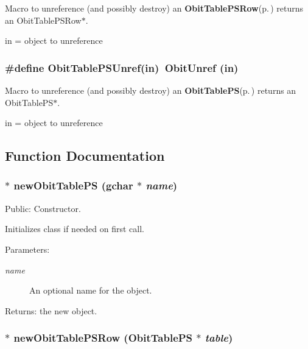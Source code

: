 Macro to unreference (and possibly destroy) an {\bf Obit\-Table\-PSRow}{\rm (p.\,\pageref{structObitTablePSRow})} returns an Obit\-Table\-PSRow$\ast$. 

in = object to unreference 
\subsubsection{\setlength{\rightskip}{0pt plus 5cm}\#define Obit\-Table\-PSUnref(in)\ Obit\-Unref (in)}\label{ObitTablePS_8h_a1}


Macro to unreference (and possibly destroy) an {\bf Obit\-Table\-PS}{\rm (p.\,\pageref{structObitTablePS})} returns an Obit\-Table\-PS$\ast$. 

in = object to unreference 

\subsection{Function Documentation}
\subsubsection{$\ast$ new\-Obit\-Table\-PS (gchar $\ast$ {\em name})}\label{ObitTablePS_8h_a11}


Public: Constructor. 

Initializes class if needed on first call. \begin{Desc}
\item[Parameters:]
\begin{description}
\item[{\em name}]An optional name for the object. \end{description}
\end{Desc}
\begin{Desc}
\item[Returns:]the new object. \end{Desc}
\subsubsection{$\ast$ new\-Obit\-Table\-PSRow ({\bf Obit\-Table\-PS} $\ast$ {\em table})}\label{ObitTablePS_8h_a8}


